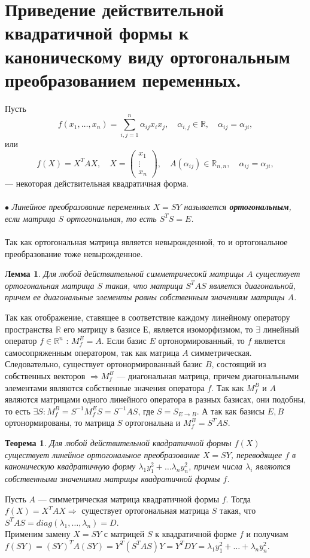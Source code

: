 \section{Приведение действительной квадратичной формы к каноническому виду ортогональным преобразованием переменных.}
Пусть $$f(x_1,\dots,x_n) = \sum_{i,j=1}^n\alpha_{ij}x_ix_j,\quad\alpha_{i,j}\in\mathbb{R},\quad\alpha_{ij}=\alpha_{ji},$$
или $$f(X) = X^T A X,\quad X=\begin{pmatrix}x_1\\ \vdots \\ x_n\end{pmatrix},\quad A(\alpha_{ij})\in\mathbb{R}_{n,n},\quad\alpha_{ij}=\alpha_{ji},$$ --- некоторая действительная квадратичная форма.\\\\
$\bullet$ \textit{Линейное преобразование переменных $X=SY$ называется \textit{\textbf{ортогональным}}, если матрица $S$ ортогональная, то есть $S^TS = E$.}\\\\
Так как ортогональная матрица является невырожденной, то и ортогональное преобразование тоже невырожденное.
\newtheorem*{lem14_7}{Лемма}\begin{lem14_7}
	Для любой действительной симметричесокй матрицы $A$ существует ортогональная матрица $S$ такая, что матрица $S^TAS$ является диагональной, причем ее диагональные элементы равны собственным значениям матрицы $A$.
\end{lem14_7}
\begin{Proof}
	Так как отображение, ставящее в соответствие каждому линейному оператору пространства $\mathbb{R}$ его матрицу в базисе $Е$, является изоморфизмом, то $\exists$ линейный оператор $f\in \mathbb{R}^n$ : $M_f^E = A$. Если базис $E$ ортонормированный, то $f$ является самосопряженным оператором, так как матрица $A$ симметрическая. Следовательно, существует ортонормированный базис $B$, состоящий из собственных векторов $\Rightarrow M_f^B$ --- диагональная матрица, причем диагональными элементами являются собственные значения оператора $f$. Так как $M_f^B$ и $A$ являются матрицами одного линейного оператора в разных базисах, они подобны, то есть $\exists S: M_f^B = S^{-1}M_f^E S=S^{-1}AS$, где $S = S_{E\rightarrow B}$. А так как базисы $E,B$ ортонормированы, то матрица $S$ ортогональна и $M_f^B = S^TAS$.
\end{Proof}
\newtheorem*{th14_7_1}{Теорема}\begin{th14_7_1}Для любой действительной квадратичной формы $f(X)$ существует линейное ортогональное преобразование $X=SY$, переводящее $f$ в каноническую квадратичную форму $\lambda_1y_1^2 + \dots \lambda_ny_n^2$, причем числа $\lambda_i$ являются собственными значениями матрицы квадратичной формы $f$.
\end{th14_7_1}\begin{Proof}
	Пусть $A$ --- симметрическая матрица квадратичной формы $f$. Тогда $f(X)=X^TAX \Rightarrow$ существует ортогональная матрица $S$ такая, что
	$S^TAS = diag(\lambda_1,\dots,\lambda_n) = D$.\\ Применим замену $X = SY$ с матрицей $S$ к квадратичной форме $f$ и получиам $f(SY)=(SY)^TA(SY)=Y^T(S^TAS)Y=Y^TDY=\lambda_1y_1^2 + \ldots + \lambda_ny_n^2$.
\end{Proof}
